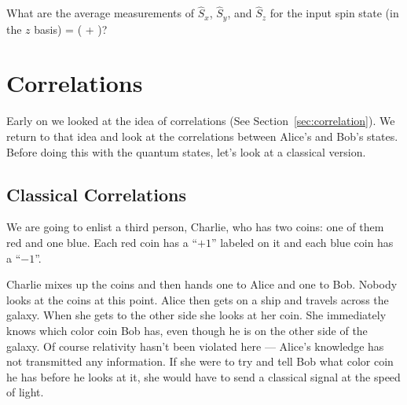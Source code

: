 \begin{exercise}
What are the average measurements of $\hat{S}_x$, $\hat{S}_y$, and $\hat{S}_z$ for the input spin state (in the $z$ basis)
\beq
{} = \left( + \right)?
\eeq
\end{exercise}

\section{Correlations}
\label{sec:covariance}
Early on we looked at the idea of correlations (See Section~\ref{sec:correlation}). We return to that idea and look at the correlations between Alice's and Bob's states. Before doing this with the quantum states, let's look at a classical version.

\subsection{Classical Correlations}
We are going to enlist a third person, Charlie, who has two coins: one of them red and one blue. Each red coin has a ``$+1$'' labeled on it and each blue coin has a ``$-1$''.\begin{marginfigure}
\end{marginfigure}
Charlie mixes up the coins and then hands one to Alice and one to Bob. Nobody looks at the coins at this point. Alice then gets on a ship and travels across the galaxy. When she gets to the other side she looks at her coin. She immediately knows which color coin Bob has, even though he is on the other side of the galaxy. Of course relativity hasn't been violated here --- Alice's knowledge has not transmitted any information. If she were to try and tell Bob what color coin he has before he looks at it, she would have to send a classical signal at the speed of light.


